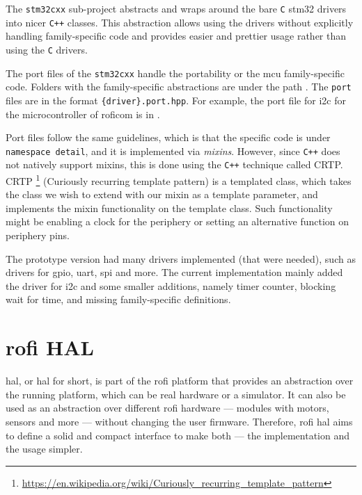 \documentclass[
  digital,     %
  oneside,     %
  nosansbold,  %
  nocolorbold, %
  nolof,         %
  nolot,         %
]{fithesis4}
\newcommand{\TODO}[1]{#1} %
\newcommand{\TODOLIST}[1]{}
\begin{document}
The \lstinline|stm32cxx| sub-project abstracts and wraps around the bare \verb|C| stm32 drivers into
nicer \verb|C++| classes. This abstraction allows using the drivers without explicitly handling
family-specific code and provides easier and prettier usage rather than using the \verb|C| drivers.

The port files of the \lstinline|stm32cxx| handle the portability or the \acrshort{mcu}
family-specific code. Folders with the family-specific abstractions are under the path
. The \verb|port| files are in the format
\verb|{driver}.port.hpp|. For example, the port file for \acrshort{i2c} for the microcontroller of
\acrshort{roficom} is in .

Port files follow the same guidelines, which is that the specific code is under \lstinline|namespace
detail|, and it is implemented via \emph{mixins}. However, since \verb|C++| does not natively
support mixins, this is done using the \verb|C++| technique called CRTP. CRTP
\footnote{\url{https://en.wikipedia.org/wiki/Curiously_recurring_template_pattern}} (Curiously
recurring template pattern) is a templated class, which takes the class we wish to extend with our
mixin as a template parameter, and implements the mixin functionality on the template class. Such
functionality might be enabling a clock for the periphery or setting an alternative function on
periphery pins.

The prototype version had many drivers implemented (that were needed), such as drivers for
\acrfull{gpio}, \acrshort{uart}, \acrshort{spi} and more. The current implementation mainly added
the driver for \acrshort{i2c} and some smaller additions, namely timer counter, blocking wait for
time, and missing family-specific definitions.

\section[ RoFI HAL ]{ \acrshort{rofi} HAL } \label{sec:rofi-hal-desc}
\TODOLIST{
\begin{itemize}
    \item ROFI HAL interface --- prototype vs changes
    \item ROFI HAL implementation esp32    
\end{itemize}
}

\acrlong{hal}, or \acrshort{hal} for short, is part of the \acrshort{rofi} platform that provides an
abstraction over the running platform, which can be real hardware or a simulator. It can also be
used as an abstraction over different \acrshort{rofi} hardware --- modules with motors, sensors and
more --- without changing the user firmware. Therefore, \acrshort{rofi} \acrshort{hal} aims to
define a solid and compact interface to make both --- the implementation and the usage simpler.
\end{document}
